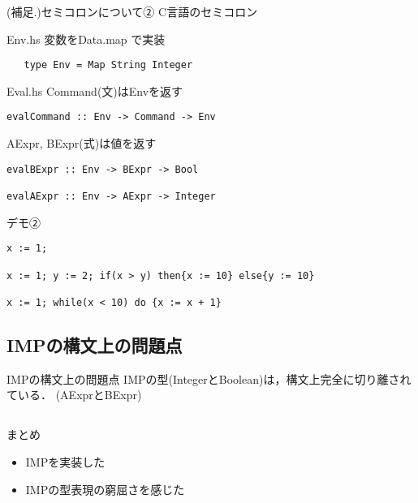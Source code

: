 \documentclass[uplatex,dvipdfmx,ja=standard]{beamer}
\begin{document}
\begin{frame}[fragile]{(補足.)セミコロンについて②}
    C言語のセミコロン
\end{frame}

\begin{frame}[fragile]{Env.hs}
    変数をData.map で実装
   \begin{verbatim}
   type Env = Map String Integer 
    \end{verbatim}
\end{frame}

\begin{frame}[fragile]{Eval.hs}
    Command(文)はEnvを返す
   \begin{verbatim}
evalCommand :: Env -> Command -> Env
    \end{verbatim}
    AExpr, BExpr(式)は値を返す
    \begin{verbatim}
evalBExpr :: Env -> BExpr -> Bool

evalAExpr :: Env -> AExpr -> Integer
    \end{verbatim}
\end{frame}

\begin{frame}[fragile]{デモ②}
    \begin{verbatim}
x := 1; 

x := 1; y := 2; if(x > y) then{x := 10} else{y := 10}

x := 1; while(x < 10) do {x := x + 1}
    \end{verbatim}
\end{frame}

\subsection{IMPの構文上の問題点}

\begin{frame}{IMPの構文上の問題点}
    IMPの型(IntegerとBoolean)は，構文上完全に切り離されている．
    (AExprとBExpr)
\end{frame}

\subsection{}

\begin{frame}{まとめ}
    \begin{itemize}
        \item \large IMPを実装した
        \item \large IMPの型表現の窮屈さを感じた
    \end{itemize}
\end{frame}
\end{document}
